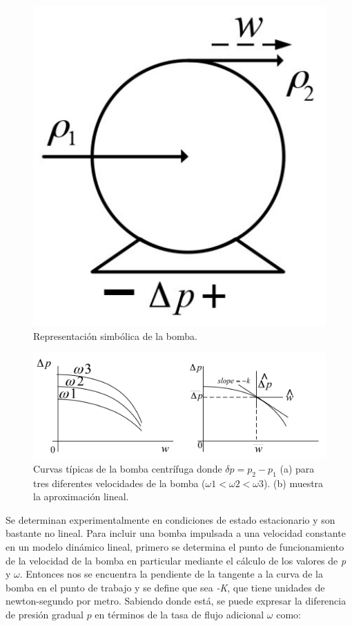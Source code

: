 \documentclass[a4paper,12pt,twoside]{proyectotanquesecci}
\begin{document}
\begin{figure}[h]
\centering
\includegraphics[scale=0.5]{Figura7}
\renewcommand{\figurename}{Fig.}
\caption{Representación simbólica de la bomba.}
\label{Representación simbólica de la bomba.}
\end{figure}

\begin{figure}[h]
\centering
\includegraphics[scale=0.5]{Figura8}
\renewcommand{\figurename}{Fig.}
\caption{Curvas típicas de la bomba centrífuga donde $\delta p=p_{2}-p_{1}$ (a) para tres diferentes velocidades de la bomba ($\omega1 < \omega2 < \omega3$). (b) muestra la aproximación lineal.}
\label{Curvas típicas de la bomba centrífuga donde $\delta p=p_{2}-p_{1}$ (a) para tres diferentes velocidades de la bomba ($\omega1 < \omega2 < \omega3$). (b) muestra la aproximación lineal.}
\end{figure}

Se determinan experimentalmente en condiciones de estado estacionario y son bastante no lineal. Para incluir una bomba impulsada a una velocidad constante en un modelo dinámico lineal, primero se determina el punto de funcionamiento de la velocidad de la bomba en particular mediante el cálculo de los valores de \textit{p} y $\omega$. Entonces nos se encuentra la pendiente de la tangente a la curva de la bomba en el punto de trabajo y se define que sea \textit{-K}, que tiene unidades de newton-segundo por metro. Sabiendo donde está, se puede expresar la diferencia de presión gradual $p$ en términos de la tasa de flujo adicional $\omega$ como:
\end{document}

